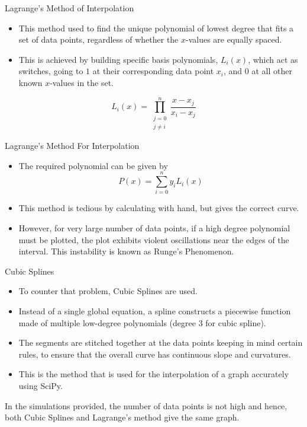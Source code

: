 \documentclass{beamer}
\begin{document}
\begin{frame}{Lagrange's Method of Interpolation}

\begin{itemize}
    \item This method used to find the unique polynomial of lowest degree that fits a set of data points, regardless of whether the $x$-values are equally spaced.
    \item This is achieved by building specific basis polynomials, $L_i(x)$, which act as switches, going to $1$ at their corresponding data point $x_i$, and $0$ at all other known $x$-values in the set.
\end{itemize}

$$L_i(x) = \prod_{\substack{j=0 \\ j \neq i}}^{n} \frac{x - x_j}{x_i - x_j}$$
    
\end{frame}

\begin{frame}{Lagrange's Method For Interpolation}

\begin{itemize}
    \item The required polynomial can be given by
    $$P(x) = \sum_{i=0}^{n} y_i L_i(x)$$
    \item This method is tedious by calculating with hand, but gives the correct curve. 
    \item However, for very large number of data points, if a high degree polynomial must be plotted, the plot exhibits violent oscillations near the edges of the interval. This instability is known as Runge's Phenomenon.
\end{itemize}
    
\end{frame}

\begin{frame}{Cubic Splines}

\begin{itemize}
    \item To counter that problem, Cubic Splines are used. 
    \item Instead of a single global equation, a spline constructs a piecewise function made of multiple low-degree polynomials (degree 3 for cubic spline). 
    \item The segments are stitched together at the data points keeping in mind certain rules, to ensure that the overall curve has continuous slope and curvatures. 
    \item This is the method that is used for the interpolation of a graph accurately using SciPy. 
\end{itemize}

In the simulations provided, the number of data points is not high and hence, both Cubic Splines and Lagrange's method give the same graph. 
    
\end{frame}
\end{document}
